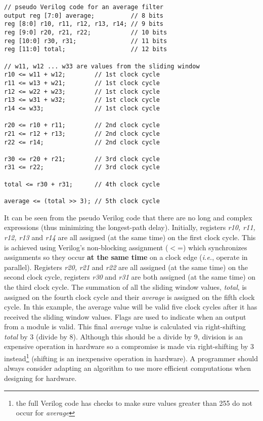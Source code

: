 \documentclass[10pt,twocolumn,letterpaper]{article}
\begin{document}
\scriptsize
\begin{verbatim}
// pseudo Verilog code for an average filter
output reg [7:0] average;          // 8 bits
reg [8:0] r10, r11, r12, r13, r14; // 9 bits
reg [9:0] r20, r21, r22;           // 10 bits
reg [10:0] r30, r31;               // 11 bits
reg [11:0] total;                  // 12 bits

// w11, w12 ... w33 are values from the sliding window
r10 <= w11 + w12;        // 1st clock cycle
r11 <= w13 + w21;        // 1st clock cycle
r12 <= w22 + w23;        // 1st clock cycle
r13 <= w31 + w32;        // 1st clock cycle
r14 <= w33;              // 1st clock cycle

r20 <= r10 + r11;        // 2nd clock cycle
r21 <= r12 + r13;        // 2nd clock cycle
r22 <= r14;              // 2nd clock cycle

r30 <= r20 + r21;        // 3rd clock cycle
r31 <= r22;              // 3rd clock cycle
			
total <= r30 + r31;      // 4th clock cycle

average <= (total >> 3); // 5th clock cycle
\end{verbatim}
\normalsize
It can be seen from the pseudo Verilog code that there are no long and complex expressions (thus minimizing the longest-path delay).
Initially, registers \emph{r10, r11, r12, r13} and \emph{r14} are all assigned (at the same time) on the first clock cycle. 
This is achieved using Verilog's non-blocking assignment ($<$=) which synchronizes assignments so they occur
{\bf at the same time} on a clock edge (\emph{i.e.}, operate in parallel).
Registers \emph{r20, r21} and \emph{r22} are all assigned (at the same time) on the second clock cycle, 
registers \emph{r30} and \emph{r31} are both
assigned (at the same time) on the third clock cycle. 
The summation of all the sliding window values, \emph{total}, is assigned on the fourth clock cycle 
and their \emph{average} is
assigned on the fifth clock cycle. 
In this example, the average value will be valid five clock cycles after
it has received the sliding window values. Flags are used to indicate when an output from a module is valid.
This final \emph{average} value is calculated via right-shifting \emph{total} by 3 (divide by 8).
Although this should be a divide by 9, division is an expensive operation in hardware so a compromise is made via
right-shifting by 3 instead\footnote{the full Verilog code has checks to make sure values greater than 255 do not occur
for \emph{average}} (shifting is an inexpensive operation in hardware). 
A programmer should always consider adapting an algorithm to use more efficient computations when designing for hardware.
\end{document}
